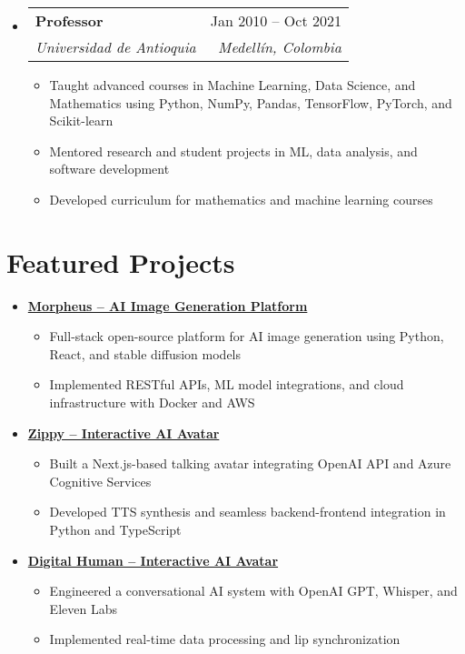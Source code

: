 \documentclass[letterpaper,11pt]{article}
\makeatletter
\newcommand{\resumeSubheading}[4]{
  \vspace{-2pt}
  \item[]
  \begin{tabular*}{\textwidth}{@{\extracolsep{\fill}}l r}
    \textbf{#1} & #2 \\
    \textit{#3} & \textit{#4} \\
  \end{tabular*}
  \vspace{-5pt}
}
\newcommand{\normalfaExternalLink}{{\mdseries\faExternalLink}}
\makeatother
\begin{document}
\begin{itemize}[leftmargin=0pt, itemindent=0pt, label={}]
\resumeSubheading
{Professor}{Jan 2010 -- Oct 2021}
{Universidad de Antioquia}{Medellín, Colombia}
\begin{itemize}[leftmargin=*]
    \item Taught advanced courses in Machine Learning, Data Science, and Mathematics using Python, NumPy, Pandas, TensorFlow, PyTorch, and Scikit-learn
    \item Mentored research and student projects in ML, data analysis, and software development
    \item Developed curriculum for mathematics and machine learning courses
\end{itemize}
\end{itemize}

\section{Featured Projects}
\begin{itemize}[leftmargin=*]
    \item \textbf{\href{https://github.com/Monadical-SAS/Morpheus}{Morpheus -- AI Image Generation Platform \normalfaExternalLink}}
    \begin{itemize}
        \item Full-stack open-source platform for AI image generation using Python, React, and stable diffusion models
        \item Implemented RESTful APIs, ML model integrations, and cloud infrastructure with Docker and AWS
    \end{itemize}
    \item \textbf{\href{https://github.com/asanchezyali/ai-avatar}{Zippy -- Interactive AI Avatar \normalfaExternalLink}}
    \begin{itemize}
        \item Built a Next.js-based talking avatar integrating OpenAI API and Azure Cognitive Services
        \item Developed TTS synthesis and seamless backend-frontend integration in Python and TypeScript
    \end{itemize}
    \item \textbf{\href{https://github.com/asanchezyali/talking-avatar-with-ai}{Digital Human -- Interactive AI Avatar \normalfaExternalLink}}
    \begin{itemize}
        \item Engineered a conversational AI system with OpenAI GPT, Whisper, and Eleven Labs
        \item Implemented real-time data processing and lip synchronization
    \end{itemize}
\end{itemize}
\end{document}
